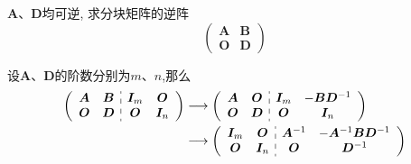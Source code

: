 \begin{brown}
    \begin{example}
        $\bm{A}$、$\bm{D}$均可逆,
        求分块矩阵的逆阵
        \[
        \begin{pmatrix}
            \bm{A}&\bm{B}\\
            \bm{O}&\bm{D}
        \end{pmatrix}
        \]
        \newpage
        \begin{solution}
        设$\bm{A}$、$\bm{D}$的阶数分别为$m$、$n$,那么
        \begin{align*}
        \left (
        \begin{array}{c:c}
            \begin{matrix}
                \bm{A}&\bm{B}\\
                \bm{O}&\bm{D}
            \end{matrix}
            &
            \begin{matrix}
                \bm{I}_m&\bm{O}\\
                \bm{O}&\bm{I}_n
            \end{matrix}
        \end{array}
        \right )
        &\longrightarrow
        \left (
        \begin{array}{c:c}
            \begin{matrix}
                \bm{A}&\bm{O}\\
                \bm{O}&\bm{D}
            \end{matrix}
            &
            \begin{matrix}
                \bm{I}_m&-\bm{BD}^{-1}\\
                \bm{O}&\bm{I}_n
            \end{matrix}
        \end{array}
        \right )\\
        &\longrightarrow
        \left (
        \begin{array}{c:c}
            \begin{matrix}
                \bm{I}_m&\bm{O}\\
                \bm{O}&\bm{I}_n
            \end{matrix}
            &
            \begin{matrix}
                \bm{A}^{-1}&-\bm{A}^{-1}\bm{BD}^{-1}\\
                \bm{O}&\bm{D}^{-1}
            \end{matrix}
        \end{array}
        \right )
    \end{align*}
        \end{solution}
    \end{example}
\end{brown}
